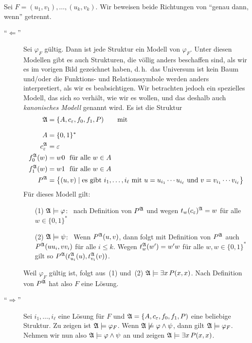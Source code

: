 \documentclass[fontsize=11pt, twoside=false, numbers=autoenddot]{scrbook}
\begin{document}
%
\begin{beweis}
  Sei $F = (u_1,v_1), \dots, (u_k,v_k)$.
  Wir beweisen beide Richtungen von "`genau dann, wenn"' getrennt.
  \begin{description}
    \item[{\boldmath "`$\Leftarrow$"'}]
      Sei $\varphi_F$ gültig.
      Dann ist jede Struktur ein Modell von $\varphi_F$.
      Unter diesen Modellen gibt es auch Strukturen, die völlig anders beschaffen sind,
      als wir es im vorigen Bild gezeichnet haben, d.\,h.\ das Universum ist kein Baum
      und/oder die Funktions- und Relationssymbole werden anders interpretiert, als wir es beabsichtigen.
      Wir betrachten jedoch ein spezielles Modell, das sich so verhält, wie wir es wollen,
      und das deshalb auch \emph{kanonisches Modell} genannt wird.
      Es ist die Struktur
      \begin{align*}
        \mathfrak{A}               & = \{A, c_\varepsilon, f_0, f_1, P) \qquad \text{mit} \\[8pt]
        A                  & = \{0,1\}^*                                          \\
        c_\varepsilon^\mathfrak{A} & = \varepsilon                                        \\
        f_0^\mathfrak{A}(w)        & = w0 ~~\text{für alle}~ w \in A                      \\
        f_1^\mathfrak{A}(w)        & = w1 ~~\text{für alle}~ w \in A                      \\
        P^\mathfrak{A}             & = \big\{(u,v) \mid \text{es gibt $i_1,\dots,i_\ell$ mit $u=u_{i_1}\cdots u_{i_\ell}$ und $v=v_{i_1}\cdots v_{i_\ell}$}\big\}
      \end{align*}
      Für dieses Modell gilt:
      \par\smallskip
      \begin{enumerate}
        \item[(1)]
          $\mathfrak{A} \models \varphi$:~
          nach Definition von $P^\mathfrak{A}$ und wegen $t_w(c_\varepsilon)^\mathfrak{A} = w$ für alle $w \in \{0,1\}^*$
          \par
        \item[(2)]
          $\mathfrak{A} \models \psi$:~
          Wenn $P^\mathfrak{A}(u,v)$, dann folgt mit Definition von $P^\mathfrak{A}$ auch $P^\mathfrak{A}(uu_i,vv_i)$ für alle $i \leq k$.
          Wegen $t_w^\mathfrak{A}(w') = w'w$ für alle $w,w \in \{0,1\}^*$
          gilt so $P^\mathfrak{A}(t_{u_i}^\mathfrak{A}(u), t_{v_i}^\mathfrak{A}(v))$.
      \end{enumerate}
      \par\smallskip
      Weil $\varphi_F$ gültig ist, folgt aus~(1) und~(2) $\mathfrak{A} \models \exists x\, P(x,x)$.
      Nach Definition von $P^\mathfrak{A}$ hat also $F$ eine Lösung.
      \par\medskip
    \item[{\boldmath "`$\Rightarrow$"'}]
      Sei $i_1,\dots,i_\ell$ eine Lösung für $F$ und $\mathfrak{A} = \{A, c_\varepsilon, f_0, f_1, P)$ eine beliebige Struktur.
      Zu zeigen ist $\mathfrak{A} \models \varphi_F$.
      Wenn $\mathfrak{A} \not\models \varphi \land \psi$, dann gilt $\mathfrak{A} \models \varphi_F$.
      Nehmen wir nun also $\mathfrak{A} \models \varphi \land \psi$ an und zeigen $\mathfrak{A} \models \exists x\, P(x,x)$.


\end{description}
\end{beweis}
\end{document}

